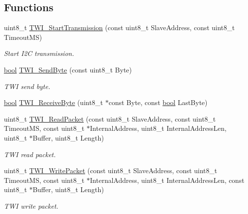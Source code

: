 \subsection*{Functions}
\begin{DoxyCompactItemize}
\item 
uint8\+\_\+t \hyperlink{group__Group__TWI__AVR8_ga5e9fac0280a2414490f628071c0073c2}{T\+W\+I\+\_\+\+Start\+Transmission} (const uint8\+\_\+t Slave\+Address, const uint8\+\_\+t Timeout\+MS)
\begin{DoxyCompactList}\small\item\em Start I2C transmission. \end{DoxyCompactList}\item 
\hyperlink{hardware_2user__config_8h_af6a258d8f3ee5206d682d799316314b1}{bool} \hyperlink{group__Group__TWI__AVR8_ga57d8ffa11749c0ba97d52c2a6e246d65}{T\+W\+I\+\_\+\+Send\+Byte} (const uint8\+\_\+t Byte)
\begin{DoxyCompactList}\small\item\em T\+WI send byte. \end{DoxyCompactList}\item 
\hyperlink{hardware_2user__config_8h_af6a258d8f3ee5206d682d799316314b1}{bool} \hyperlink{group__Group__TWI__AVR8_ga551074dff05c93c7317440b55278aa1b}{T\+W\+I\+\_\+\+Receive\+Byte} (uint8\+\_\+t $\ast$const Byte, const \hyperlink{hardware_2user__config_8h_af6a258d8f3ee5206d682d799316314b1}{bool} Last\+Byte)
\item 
uint8\+\_\+t \hyperlink{group__Group__TWI__AVR8_gaea02d723a16ed7f11d485c24175d8117}{T\+W\+I\+\_\+\+Read\+Packet} (const uint8\+\_\+t Slave\+Address, const uint8\+\_\+t Timeout\+MS, const uint8\+\_\+t $\ast$Internal\+Address, uint8\+\_\+t Internal\+Address\+Len, uint8\+\_\+t $\ast$Buffer, uint8\+\_\+t Length)
\begin{DoxyCompactList}\small\item\em T\+WI read packet. \end{DoxyCompactList}\item 
uint8\+\_\+t \hyperlink{group__Group__TWI__AVR8_ga7a9c708e4d9fbe6ed807f582bcbded0e}{T\+W\+I\+\_\+\+Write\+Packet} (const uint8\+\_\+t Slave\+Address, const uint8\+\_\+t Timeout\+MS, const uint8\+\_\+t $\ast$Internal\+Address, uint8\+\_\+t Internal\+Address\+Len, const uint8\+\_\+t $\ast$Buffer, uint8\+\_\+t Length)
\begin{DoxyCompactList}\small\item\em T\+WI write packet. \end{DoxyCompactList}\end{DoxyCompactItemize}



